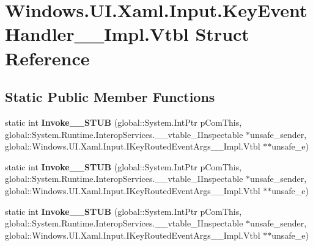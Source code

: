 \hypertarget{struct_windows_1_1_u_i_1_1_xaml_1_1_input_1_1_key_event_handler_____impl_1_1_vtbl}{}\section{Windows.\+U\+I.\+Xaml.\+Input.\+Key\+Event\+Handler\+\_\+\+\_\+\+Impl.\+Vtbl Struct Reference}
\label{struct_windows_1_1_u_i_1_1_xaml_1_1_input_1_1_key_event_handler_____impl_1_1_vtbl}
\subsection*{Static Public Member Functions}
\begin{DoxyCompactItemize}
\item 
\mbox{\label{struct_windows_1_1_u_i_1_1_xaml_1_1_input_1_1_key_event_handler_____impl_1_1_vtbl_a66455260077046c054f01de5906b1d0b}} 
static int {\bfseries Invoke\+\_\+\+\_\+\+S\+T\+UB} (global\+::\+System.\+Int\+Ptr p\+Com\+This, global\+::\+System.\+Runtime.\+Interop\+Services.\+\_\+\+\_\+vtable\+\_\+\+I\+Inspectable $\ast$unsafe\+\_\+sender, global\+::\+Windows.\+U\+I.\+Xaml.\+Input.\+I\+Key\+Routed\+Event\+Args\+\_\+\+\_\+\+Impl.\+Vtbl $\ast$$\ast$unsafe\+\_\+e)
\item 
\mbox{\label{struct_windows_1_1_u_i_1_1_xaml_1_1_input_1_1_key_event_handler_____impl_1_1_vtbl_a66455260077046c054f01de5906b1d0b}} 
static int {\bfseries Invoke\+\_\+\+\_\+\+S\+T\+UB} (global\+::\+System.\+Int\+Ptr p\+Com\+This, global\+::\+System.\+Runtime.\+Interop\+Services.\+\_\+\+\_\+vtable\+\_\+\+I\+Inspectable $\ast$unsafe\+\_\+sender, global\+::\+Windows.\+U\+I.\+Xaml.\+Input.\+I\+Key\+Routed\+Event\+Args\+\_\+\+\_\+\+Impl.\+Vtbl $\ast$$\ast$unsafe\+\_\+e)
\item 
\mbox{\label{struct_windows_1_1_u_i_1_1_xaml_1_1_input_1_1_key_event_handler_____impl_1_1_vtbl_a66455260077046c054f01de5906b1d0b}} 
static int {\bfseries Invoke\+\_\+\+\_\+\+S\+T\+UB} (global\+::\+System.\+Int\+Ptr p\+Com\+This, global\+::\+System.\+Runtime.\+Interop\+Services.\+\_\+\+\_\+vtable\+\_\+\+I\+Inspectable $\ast$unsafe\+\_\+sender, global\+::\+Windows.\+U\+I.\+Xaml.\+Input.\+I\+Key\+Routed\+Event\+Args\+\_\+\+\_\+\+Impl.\+Vtbl $\ast$$\ast$unsafe\+\_\+e)
$$
\end{DoxyCompactItemize}
